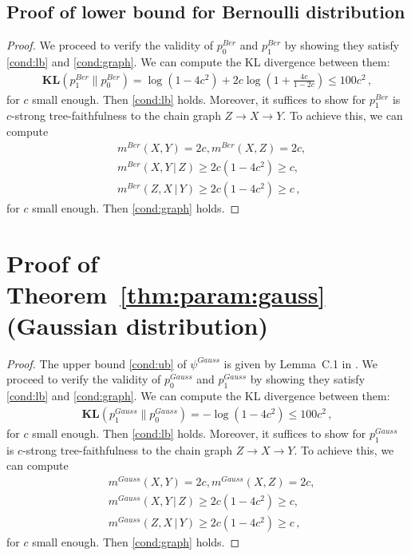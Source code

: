 \documentclass{article}
\theoremstyle{definition}
\theoremstyle{definition}
\theoremstyle{definition}
\theoremstyle{definition}
\theoremstyle{definition}
\theoremstyle{definition}
\theoremstyle{remark}
\theoremstyle{remark}
\newcommand{\given}{\,|\,}
\newcommand{\dpdm}{m}
\begin{document}
\subsection{Proof of lower bound for Bernoulli distribution}
\begin{proof}
We proceed to verify the validity of $p_0^{Ber}$ and $p_1^{Ber}$ by showing they satisfy \ref{cond:lb} and \ref{cond:graph}. 
We can compute the KL divergence between them:
\begin{align*}
    \mathbf{KL}(p_1^{Ber}\|p_0^{Ber}) = \log (1-4c^2) + 2c\log(1+\frac{4c}{1-2c}) \le 100c^2 \,,
\end{align*}
for $c$ small enough. Then \ref{cond:lb} holds.
Moreover, it suffices to show for $p_1^{Ber}$ is $c$-strong tree-faithfulness to the chain graph $Z\to X\to Y$. To achieve this, we can compute
\begin{align*}
    &\dpdm^{Ber}(X,Y) = 2c, \dpdm^{Ber}(X,Z) = 2c, \\
    &\dpdm^{Ber}(X,Y\given Z)\ge 2c(1-4c^2)\ge c, \\
    & \dpdm^{Ber}(Z,X\given Y)\ge 2c(1-4c^2)\ge c\,,
\end{align*}
for $c$ small enough. Then \ref{cond:graph} holds.
\end{proof}


\section{Proof of Theorem~\ref{thm:param:gauss} (Gaussian distribution)}\label{app:gauss}
\begin{proof}
The upper bound \ref{cond:ub} of $\psi^{Gauss}$ is given by Lemma~C.1 in \citet{wang2024optimal}. We proceed to verify the validity of $p_0^{Gauss}$ and $p_1^{Gauss}$ by showing they satisfy \ref{cond:lb} and \ref{cond:graph}. 
We can compute the KL divergence between them:
\begin{align*}
    \mathbf{KL}(p_1^{Gauss}\|p_0^{Gauss}) = -\log(1-4c^2) \le 100c^2 \,,
\end{align*}
for $c$ small enough. Then \ref{cond:lb} holds.
Moreover, it suffices to show for $p_1^{Gauss}$ is $c$-strong tree-faithfulness to the chain graph $Z\to X\to Y$. To achieve this, we can compute
\begin{align*}
    &\dpdm^{Gauss}(X,Y) = 2c, \dpdm^{Gauss}(X,Z) = 2c, \\
    &\dpdm^{Gauss}(X,Y\given Z)\ge 2c(1-4c^2)\ge c, \\
    &\dpdm^{Gauss}(Z,X\given Y)\ge 2c(1-4c^2)\ge c\,,
\end{align*}
for $c$ small enough. Then \ref{cond:graph} holds.
\end{proof}
\end{document}
